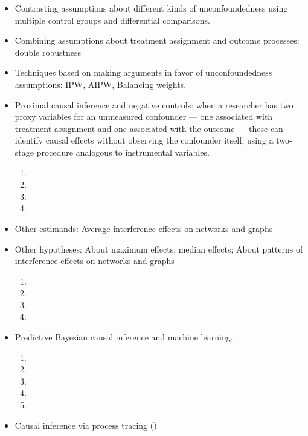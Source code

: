\documentclass[11pt,letterpaper]{article}
\begin{document}
\begin{itemize}
    \item Contrasting assumptions about different kinds of unconfoundedness using multiple control groups and differential comparisons.
    \item Combining assumptions about treatment assignment and outcome processes: double robustness
    \item Techniques based on making arguments in favor of unconfoundedness assumptions: IPW, AIPW, Balancing weights.
    \item Proximal causal inference and negative controls: when a researcher has
        two proxy variables for an unmeasured confounder --- one associated with
        treatment assignment and one associated with the outcome --- these can
        identify causal effects without observing the confounder itself, using a
        two-stage procedure analogous to instrumental variables.
        \begin{enumerate}[noitemsep]
          \item {}
          \item {}
          \item {}
          \item {}
        \end{enumerate}
    \item Other estimands: Average interference effects on networks and graphs
    \item Other hypotheses: About maximum effects, median effects; About patterns of interference effects on networks and graphs
        \begin{enumerate}[noitemsep]
          \item {}
          \item {}
          \item {}
          \item {}
        \end{enumerate}
    \item Predictive Bayesian causal inference and machine learning.\\
        \begin{enumerate}[noitemsep]
          \item {}
          \item {}
          \item {}
          \item {}
          \item {}
        \end{enumerate}
    \item Causal inference via process tracing ()
\end{itemize}
\end{document}
